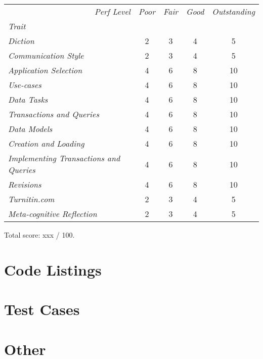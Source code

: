 \documentclass[11pt]{article}
\begin{document}
\begin{center}
\begin{tabular}{p{2.0in}cccc}
\toprule
\multicolumn{1}{r}{\emph{Perf Level}} & \emph{Poor} & \emph{Fair} & \emph{Good} & \emph{Outstanding} \\
\multicolumn{1}{l}{\emph{Trait}} & & & & \\
\midrule

\emph{Diction} &
2 & 3 & 4 & 5 \\ \midrule

\emph{Communication Style} & 
2 & 3 & 4 & 5 \\ \midrule

\emph{Application Selection} &
4 & 6 & 8 & 10 \\ \midrule

\emph{Use-cases} &
4 & 6 & 8 & 10 \\ \midrule

\emph{Data Tasks} &
4 & 6 & 8 & 10 \\ \midrule

\emph{Transactions and Queries} &
4 & 6 & 8 & 10 \\ \midrule

\emph{Data Models} &
4 & 6 & 8 & 10 \\ \midrule

\emph{Creation and Loading} &
4 & 6 & 8 & 10 \\ \midrule

\emph{Implementing Transactions and Queries} &
4 & 6 & 8 & 10 \\ \midrule

\emph{Revisions} & 
4 & 6 & 8 & 10 \\ \midrule


\emph{Turnitin.com} &
2 & 3 & 4 & 5 \\ \midrule


\emph{Meta-cognitive Reflection} &
2 & 3 & 4 & 5 \\ \bottomrule

\end{tabular}
\end{center}

\vspace*{0.2in}

\noindent Total score: xxx / 100.

\begin{appendices}

\section{Code Listings} 

\section{Test Cases} 

\section{Other} 


\end{appendices}
\end{document}
